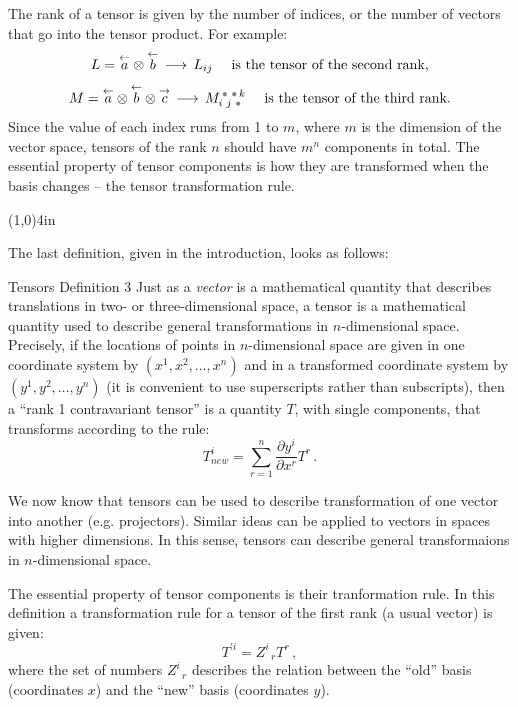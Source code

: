 The rank of a tensor is given by the number of indices, or the number
of vectors that go into the tensor product. For example:
\[
L=\overset{\leftarrow}{a}\otimes\overset{\leftarrow}{b}\,\longrightarrow\, L_{ij}\quad \textrm{ is
  the tensor of the second rank,}
\]
\[
M=\vecl{a}\otimes\vecl{b}\otimes\vec{c}\,\longrightarrow\,
M_{i\,\,j\,\tus}^{\tus\tus k}\quad \textrm{ is the tensor of the third rank.}
\]
Since the value of each index runs from 1 to $m$, where $m$ is the
dimension of the vector space, tensors of the rank $n$ should have
$m^n$ components in total. The essential property of tensor components
is how they are transformed when the basis changes -- the tensor
transformation rule.
\begin{center}
\line(1,0){4in}
\end{center}
\vspace{0.5cm}
The last definition, given in the introduction, looks as follows:
\begin{mydef}{Tensors Definition 3}
Just as a \emph{vector} is a mathematical quantity
that describes translations in two- or three-dimensional
space, a tensor is a mathematical quantity used to
describe general transformations in $n$-dimensional
space. Precisely, if the locations of points in $n$-dimensional
space are given in one coordinate system by
$(x^1,x^2,…,x^n)$ and in a transformed coordinate system
by $(y^1, y^2,…,y^n)$ (it is convenient to use superscripts
rather than subscripts), then a “rank 1 contravariant
tensor” is a quantity $T$, with single components, that
transforms according to the rule:
\begin{equation*}
	T^i_{new} = \sum\limits_{r=1}^{n} \frac{\partial y^i}{\partial x^r} T^r\,.
\end{equation*}
\vspace{0.2cm}
\end{mydef}

We now know that tensors can be used to describe transformation of one
vector into another (e.g. projectors). Similar ideas can be applied
to vectors in spaces with higher dimensions. In this sense, tensors
can describe general transformaions in $n$-dimensional space.

The essential property of tensor components is their tranformation
rule. In this definition a transformation rule for a tensor of the
first rank (a usual vector) is given:
\[
T^{'i} = Z^i_{\phantom{x}r}T^r\,,
\]
where the set of numbers $Z^i_{\phantom{x}r}$ describes the relation
between the ``old'' basis (coordinates $x$) and the ``new'' basis
(coordinates $y$).

